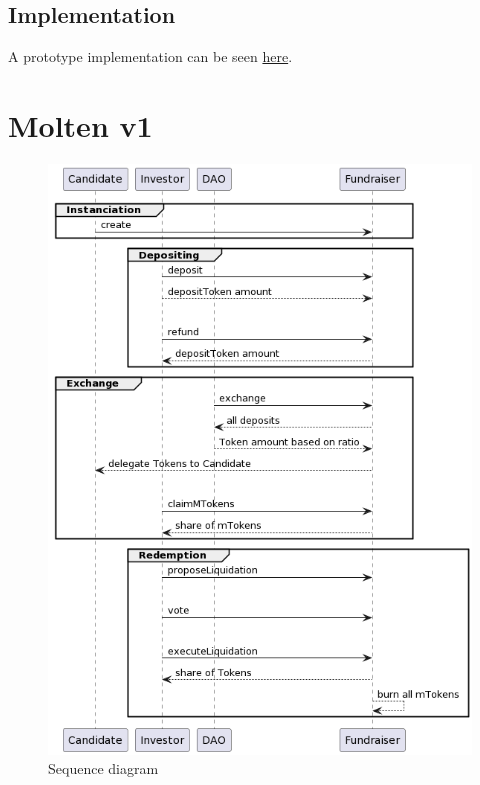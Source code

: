 \documentclass[
]{article}
\begin{document}
\hypertarget{implementation}{%
\subsection{Implementation}\label{implementation}}

A prototype implementation can be seen \href{}{here}.

\appendix
\hypertarget{molten-v1}{%
\section{Molten v1}\label{molten-v1}}

\begin{figure}
\centering
\includegraphics[width=\textwidth]{./img/molten-fundraiser-v1-seq-diag.png}
\caption{Sequence diagram}
\end{figure}
\end{document}
